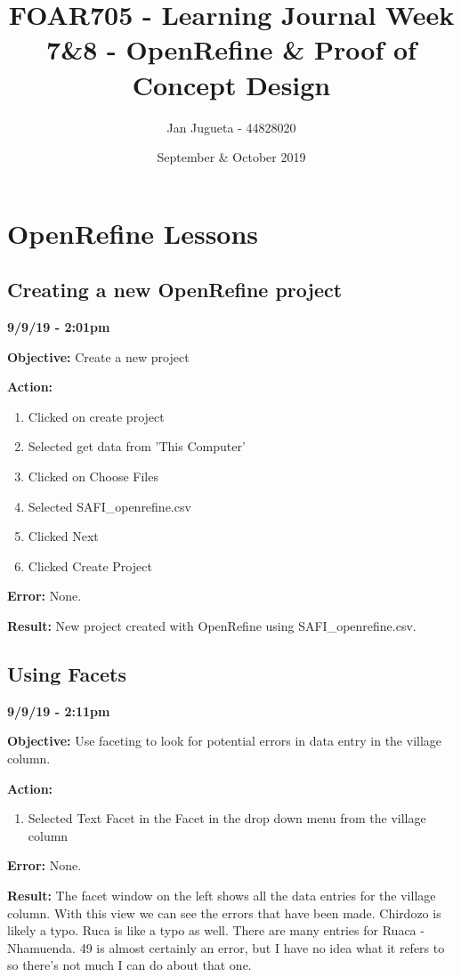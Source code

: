 \documentclass{article}
\title{FOAR705 - Learning Journal Week 7\&8 - OpenRefine \& Proof of Concept Design}
\author{Jan Jugueta - 44828020}
\date{September \& October 2019}
\begin{document}
\maketitle

\tableofcontents

\newpage
\section{OpenRefine Lessons}

\subsection{Creating a new OpenRefine project}

\textbf{9/9/19 - 2:01pm}

\textbf{Objective:} Create a new project

\textbf{Action:}

\begin{enumerate}
    \item Clicked on create project
    \item Selected get data from 'This Computer'
    \item Clicked on Choose Files
    \item Selected SAFI\_openrefine.csv
    \item Clicked Next
    \item Clicked Create Project
\end{enumerate}

\textbf{Error:} None.

\textbf{Result:} New project created with OpenRefine using SAFI\_openrefine.csv.

\subsection{Using Facets}

\textbf{9/9/19 - 2:11pm}

\textbf{Objective:} Use faceting to look for potential errors in data entry in the village column.

\textbf{Action:}

\begin{enumerate}
    \item Selected Text Facet in the Facet in the drop down menu from the village column
\end{enumerate}

\textbf{Error:} None.

\textbf{Result:} The facet window on the left shows all the data entries for the village column. With this view we can see the errors that have been made. Chirdozo is likely a typo. Ruca is like a typo as well. There are many entries for Ruaca - Nhamuenda. 49 is almost certainly an error, but I have no idea what it refers to so there's not much I can do about that one.
\end{document}
